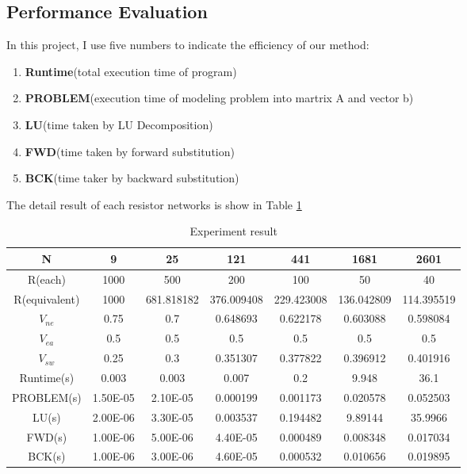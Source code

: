 \documentclass{article}
\begin{document}
\subsection{Performance Evaluation}
In this project, I use five numbers to indicate the efficiency of our method:
\begin{enumerate}
    \item \textbf{Runtime}(total execution time of program)
    \item \textbf{PROBLEM}(execution time of modeling problem into martrix A and vector b)
    \item \textbf{LU}(time taken by LU Decomposition)
    \item \textbf{FWD}(time taken by forward substitution)
    \item \textbf{BCK}(time taker by backward substitution)
\end{enumerate}
The detail result of each resistor networks is show in Table \ref{tab:result}
\begin{table}[htbp]
  \centering
    \begin{tabular}{|c|c|c|c|c|c|c|}
    \hline
    \textbf{N}   & \textbf{9}   & \textbf{25}  & \textbf{121} & \textbf{441} & \textbf{1681} & \textbf{2601} \bigstrut\\
    \hline
    R(each) & 1000 & 500 & 200 & 100 & 50  & 40 \bigstrut\\
    \hline
    R(equivalent) & 1000 & 681.818182 & 376.009408 & 229.423008 & 136.042809 & 114.395519 \bigstrut\\
    \hline
    $V_{ne}$ & 0.75 & 0.7 & 0.648693 & 0.622178 & 0.603088 & 0.598084 \bigstrut\\
    \hline
    $V_{ea}$ & 0.5 & 0.5 & 0.5 & 0.5 & 0.5 & 0.5 \bigstrut\\
    \hline
    $V_{sw}$ & 0.25 & 0.3 & 0.351307 & 0.377822 & 0.396912 & 0.401916 \bigstrut\\
    \hline
    Runtime(s) & 0.003 & 0.003 & 0.007 & 0.2 & 9.948 & 36.1 \bigstrut\\
    \hline
    PROBLEM(s) & 1.50E-05 & 2.10E-05 & 0.000199 & 0.001173 & 0.020578 & 0.052503 \bigstrut\\
    \hline
    LU(s) & 2.00E-06 & 3.30E-05 & 0.003537 & 0.194482 & 9.89144 & 35.9966 \bigstrut\\
    \hline
    FWD(s) & 1.00E-06 & 5.00E-06 & 4.40E-05 & 0.000489 & 0.008348 & 0.017034 \bigstrut\\
    \hline
    BCK(s) & 1.00E-06 & 3.00E-06 & 4.60E-05 & 0.000532 & 0.010656 & 0.019895 \bigstrut\\
    \hline
    \end{tabular}%
  \caption{Experiment result}
  \label{tab:result}%
\end{table}%
\end{document}
